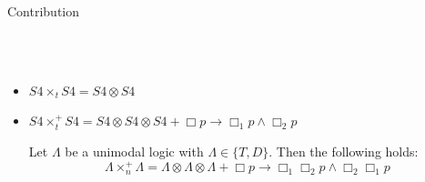 \begin{frame}{Contribution}

    \hspace{0.4cm}{\color{gray!40}\small$\bullet$}\\[-0.5ex]
    \hspace{0.4cm}{\color{gray!40}\small$\bullet$}\\[-0.5ex]
    \hspace{0.4cm}{\color{gray!40}\small$\bullet$}

    \begin{itemize}
        
        \item $S4 \times_t S4 = S4 \otimes S4$
        \item $S4 \times_t^+ S4 = S4 \otimes S4 \otimes S4 + \Box p \to \Box_1p \land \Box_2p$ 
        \begin{theorem}
        Let $\Lambda$ be a unimodal logic with $\Lambda \in \{T,D\}$. Then the following holds:
        \[
             \Lambda \times_n^+ \Lambda = \Lambda \otimes \Lambda \otimes \Lambda + \Box p \to \Box_1\Box_2p \land \Box_2\Box_1p 
        \]
        \end{theorem}

    \end{itemize}
\end{frame}
